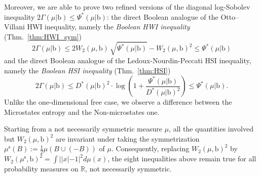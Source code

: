 \documentclass[10pt, reqno]{amsart}
\numberwithin{equation}{section}
\theoremstyle{definition}
\theoremstyle{plain}
\theoremstyle{remark}
\newcommand{\1}{\mathbbm{1}}
\begin{document}
Moreover, we are able to prove two refined versions of the diagonal log-Sobolev inequality $ 2\Gamma(\mu|\mathbb{\mathrm{b}})\leq \Psi^*(\mu|\mathbb{\mathrm{b}})$: the direct Boolean analogue of the Otto–Villani HWI inequality, namely the \emph{Boolean HWI inequality} (Thm.~\ref{thm:HWI_sym}) 
$$2\Gamma(\mu|\mathbb{\mathrm{b}})
\leq
2 W_2(\mu,\mathbb{\mathrm{b}})\,\sqrt{\Psi^*(\mu|\mathbb{\mathrm{b}})}
-W_2(\mu,\mathbb{\mathrm{b}})^2\leq \Psi^*(\mu|\mathbb{\mathrm{b}})$$
and the direct Boolean analogue of the Ledoux-Nourdin-Peccati HSI inequality, namely the \emph{Boolean HSI inequality} (Thm.~\ref{thm:HSI}) 
$$ 2\Gamma(\mu|\mathbb{\mathrm{b}})\leq D^*(\mu|\mathbb{\mathrm{b}})^2\cdot \log\left(1+\frac{\Psi^*(\mu|\mathbb{\mathrm{b}})}{D^*(\mu|\mathbb{\mathrm{b}})^2}\right)\leq \Psi^*(\mu|\mathbb{\mathrm{b}}).$$
Unlike the one-dimensional free case,  we observe a difference between the Microstates entropy and the Non-microstates one.

Starting from a not necessarily symmetric measure $\mu$, all the quantities involved but $W_2(\mu,\mathbb{\mathrm{b}})^2$ are invariant under taking the symmetrization $\mu^{\mathrm{s}}(B):=\frac{1}{2}\mu(B\cup (-B))$ of $\mu$. Consequently, replacing $W_2(\mu,\mathbb{\mathrm{b}})^2$ by $W_2(\mu^{\mathrm{s}},\mathbb{\mathrm{b}})^2=\int||x|-1|^2 d\mu(x)$, the eight inequalities above remain true for all probability measures on $\mathbb{R}$, not necessarily symmetric.



$ $
\end{document}
